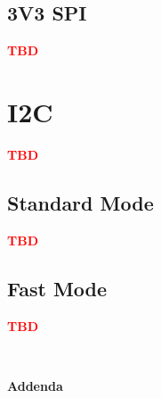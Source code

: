 \documentclass[11pt, a4paper, listof=numbered, captions=tableheading, headinclude, table, xcdraw]{scrreprt}
\begin{document}
\subsection{3V3 SPI}
\textbf{\textcolor[HTML]{FF0000}{TBD}}

\section{I2C}
\textbf{\textcolor[HTML]{FF0000}{TBD}}
\subsection{Standard Mode}
\textbf{\textcolor[HTML]{FF0000}{TBD}}
\subsection{Fast Mode}
\textbf{\textcolor[HTML]{FF0000}{TBD}}



\pagestyle{empty}
\vspace*{\fill}
\begin{center}
\hrulefill\\
\vspace{4mm}
	\begin{HUGE}
		\textbf{Addenda}
	\end{HUGE}\\
\hrulefill\\
\end{center}
\vspace*{\fill}
\newpage
\pagestyle{plain}
\end{document}
